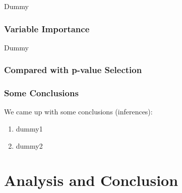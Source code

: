 \documentclass{beamer}
\begin{document}
\begin{frame}
Dummy
\frametitle{Variable Importance}
\end{frame}

\begin{frame}
Dummy
\frametitle{Compared with p-value Selection}
\end{frame}

\begin{frame}
\frametitle{Some Conclusions}
We came up with some conclusions (inferences):
\begin{enumerate}[<+(1)->]
	\item dummy1
	\item dummy2
\end{enumerate}
\end{frame}


\section{Analysis and Conclusion}
\end{document}
